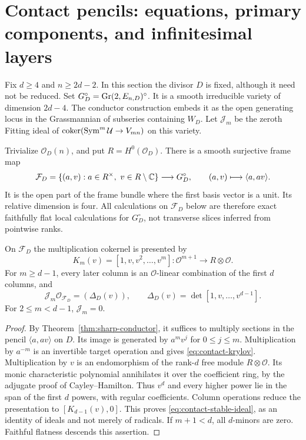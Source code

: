 \section{Contact pencils: equations, primary components, and infinitesimal layers}
\label{sec:contact-primary-structure}
Fix $d\ge4$ and $n\ge2d-2$. In this section the divisor $D$ is
fixed, although it need not be reduced. Set
$G_D^\circ=\operatorname{Gr}(2,E_{n,D})^\circ$. It is a smooth irreducible variety
of dimension $2d-4$. The conductor construction embeds it as the
open generating locus in the Grassmannian of subseries containing
$W_D$. Let $\mathcal J_m$ be the zeroth Fitting ideal of
$\operatorname{coker}(\operatorname{Sym}^m\mathcal U\to V_{mn})$ on this variety.

Trivialize $\mathcal O_D(n)$, and put $R=H^0(\mathcal O_D)$.
There is a smooth surjective frame map
\begin{equation}\label{eq:contact-frame}
 \mathcal F_D=\{(a,v):a\in R^\times,\ v\in R\setminus\mathbb C\}
 \longrightarrow G_D^\circ,\qquad (a,v)\longmapsto\langle a,av\rangle.
\end{equation}
It is the open part of the frame bundle where the first basis vector
is a unit. Its relative dimension is four. All calculations on
$\mathcal F_D$ below are therefore exact faithfully flat local
calculations for $G_D^\circ$, not transverse slices inferred from
pointwise ranks.

\begin{lemma}\label{lem:contact-power-basis}
On $\mathcal F_D$ the multiplication cokernel is presented by
\begin{equation}\label{eq:contact-krylov}
 K_m(v)=[1,v,v^2,\ldots,v^m]:\mathcal O^{m+1}
                              \longrightarrow R\otimes\mathcal O.
\end{equation}
For $m\ge d-1$, every later column is an $\mathcal O$-linear
combination of the first $d$ columns, and
\begin{equation}\label{eq:contact-stable-ideal}
 \mathcal J_m\mathcal O_{\mathcal F_D}=(\Delta_D(v)),\qquad
 \Delta_D(v)=\det[1,v,\ldots,v^{d-1}].
\end{equation}
For $2\le m<d-1$, $\mathcal J_m=0$.
\end{lemma}
\begin{proof}
By Theorem~\ref{thm:sharp-conductor}, it suffices to multiply
sections in the pencil $\langle a,av\rangle$ on $D$. Its image
is generated by $a^m v^j$ for $0\le j\le m$. Multiplication by
$a^{-m}$ is an invertible target operation and gives
\eqref{eq:contact-krylov}. Multiplication by $v$ is an endomorphism
of the rank-$d$ free module $R\otimes\mathcal O$. Its monic
characteristic polynomial annihilates it over the coefficient ring,
by the adjugate proof of Cayley--Hamilton. Thus $v^d$ and every
higher power lie in the span of the first $d$ powers, with regular
coefficients. Column operations reduce the presentation to
$[K_{d-1}(v),0]$. This proves \eqref{eq:contact-stable-ideal}, as an
identity of ideals and not merely of radicals. If $m+1<d$, all
$d$-minors are zero. Faithful flatness descends this assertion.
\end{proof}

